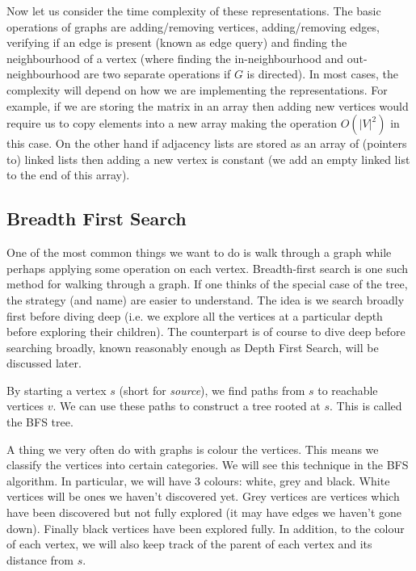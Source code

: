 Now let us consider the time complexity of these representations. The basic operations of graphs are adding/removing vertices, adding/removing edges, verifying if an edge is present (known as edge query) and finding the neighbourhood of a vertex (where finding the in-neighbourhood and out-neighbourhood are two separate operations if $G$ is directed). In most cases, the complexity will depend on how we are implementing the representations. For example, if we are storing the matrix in an array then adding new vertices would require us to copy elements into a new array making the operation $O(|V|^2)$ in this case. On the other hand if adjacency lists are stored as an array of (pointers to) linked lists then adding a new vertex is constant (we add an empty linked list to the end of this array).

\subsection{Breadth First Search}
One of the most common things we want to do is walk through a graph while perhaps applying some operation on each vertex. Breadth-first search is one such method for walking through a graph. If one thinks of the special case of the tree, the strategy (and name) are easier to understand. The idea is we search broadly first before diving deep (i.e. we explore all the vertices at a particular depth before exploring their children). The counterpart is of course to dive deep before searching broadly, known reasonably enough as Depth First Search, will be discussed later. 

By starting a vertex $s$ (short for \textit{source}), we find paths from $s$ to reachable vertices $v$. We can use these paths to construct a tree rooted at $s$. This is called the BFS tree. 

A thing we very often do with graphs is colour the vertices. This means we classify the vertices into certain categories. We will see this technique in the BFS algorithm. In particular, we will have 3 colours: white, grey and black. White vertices will be ones we haven't discovered yet. Grey vertices are vertices which have been discovered but not fully explored (it may have edges we haven't gone down). Finally black vertices have been explored fully. In addition, to the colour of each vertex, we will also keep track of the parent of each vertex and its distance from $s$.

